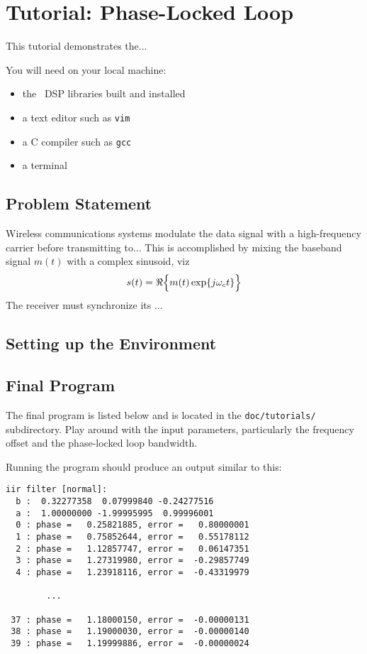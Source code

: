 % 
%

\newpage
\section{Tutorial: Phase-Locked Loop}
\label{tutorial:pll}
This tutorial demonstrates the...

You will need on your local machine:
\begin{itemize}
\item the \liquid\ DSP libraries built and installed
\item a text editor such as {\tt vim} \cite{vim:web}
\item a C compiler such as {\tt gcc} \cite{gcc:web}
\item a terminal
\end{itemize}

\subsection{Problem Statement}
\label{tutorial:pll:problem}
Wireless communications systems modulate the data signal with
a high-frequency carrier before transmitting to...
This is accomplished by mixing the baseband signal $m(t)$
with a complex sinusoid, viz
\[
    s(t) = \Re\Bigl\{ m(t)\exp\{j\omega_ct\} \Bigr\}
\]
The receiver must synchronize its ...


\subsection{Setting up the Environment}
\label{tutorial:pll:environment}


\subsection{Final Program}
\label{tutorial:pll:completed}

The final program is listed below and is located in the
{\tt doc/tutorials/} subdirectory.
Play around with the input parameters, particularly the frequency offset
and the phase-locked loop bandwidth.



Running the program should produce an output similar to this:
\begin{verbatim}
iir filter [normal]:
  b :  0.32277358  0.07999840 -0.24277516
  a :  1.00000000 -1.99995995  0.99996001
  0 : phase =   0.25821885, error =   0.80000001
  1 : phase =   0.75852644, error =   0.55178112
  2 : phase =   1.12857747, error =   0.06147351
  3 : phase =   1.27319980, error =  -0.29857749
  4 : phase =   1.23918116, error =  -0.43319979

        ...

 37 : phase =   1.18000150, error =  -0.00000131
 38 : phase =   1.19000030, error =  -0.00000140
 39 : phase =   1.19999886, error =  -0.00000024
\end{verbatim}
